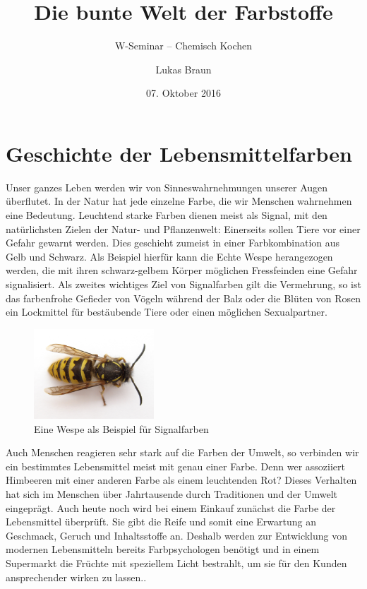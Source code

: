 \documentclass[11pt]{scrreprt}
\title{Die bunte Welt der Farbstoffe}
\author{Lukas Braun}
\subtitle{W-Seminar -- Chemisch Kochen}
\date{07. Oktober 2016}
\begin{document}
\renewcommand{\abstractname}{Abstract}
\maketitle
\clearpage
{}

\begin{abstract}
	\noindent

\end{abstract}

\clearpage
\tableofcontents
\clearpage
\listoffigures
\clearpage
\chapter{Geschichte der Lebensmittelfarben}
Unser ganzes Leben werden wir von Sinneswahrnehmungen unserer Augen überflutet. In der Natur hat jede einzelne Farbe, die wir Menschen wahrnehmen eine Bedeutung. Leuchtend starke Farben dienen meist als Signal, mit den natürlichsten Zielen der Natur- und Pflanzenwelt: Einerseits sollen Tiere vor einer Gefahr gewarnt werden. Dies geschieht zumeist in einer Farbkombination aus Gelb und Schwarz. Als Beispiel hierfür kann die Echte Wespe herangezogen werden, die mit ihren schwarz-gelbem Körper möglichen Fressfeinden eine Gefahr signalisiert. Als zweites wichtiges Ziel von Signalfarben gilt die Vermehrung, so ist das farbenfrohe Gefieder von Vögeln während der Balz oder die Blüten von Rosen ein Lockmittel für bestäubende Tiere oder einen möglichen Sexualpartner. 

\begin{figure}[ht!]
	\centering
	\includegraphics[width=0.4\textwidth]{wespe.jpg}
	\caption[Eine Wespe als Beispiel für Signalfarben, das Bild wurde vom Nutzer \textit{Trounce} über die Wikimedia Commons zur Verfügung gestellt.]{Eine Wespe als Beispiel für Signalfarben}
	\label{img:wasp}
\end{figure}

Auch Menschen reagieren sehr stark auf die Farben der Umwelt, so verbinden wir ein bestimmtes Lebensmittel meist mit genau einer Farbe. Denn wer assoziiert Himbeeren mit einer anderen Farbe als einem leuchtenden Rot? Dieses Verhalten hat sich im Menschen über Jahrtausende durch Traditionen und der Umwelt eingeprägt. Auch heute noch wird bei einem Einkauf zunächst die Farbe der Lebensmittel überprüft. Sie gibt die Reife und somit eine Erwartung an Geschmack, Geruch und Inhaltsstoffe an. Deshalb werden zur Entwicklung von modernen Lebensmitteln bereits Farbpsychologen benötigt und in einem Supermarkt die Früchte mit speziellem Licht bestrahlt, um sie für den Kunden ansprechender wirken zu lassen\cite[S. 88ff]{Hamatschek.2016}..
\end{document}
